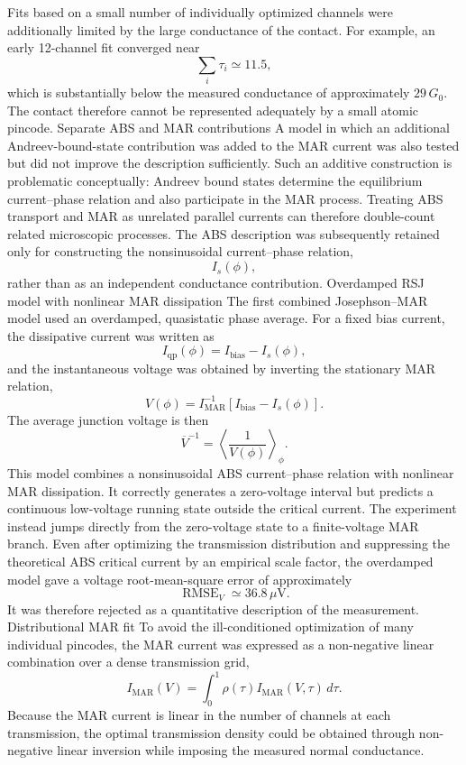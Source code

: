 Fits based on a small number of individually optimized channels were additionally limited by the large conductance of the contact. For example, an early 12-channel fit converged near
\[
\sum_i\tau_i\simeq11.5,
\]which is substantially below the measured conductance of approximately \(29\,G_0\). The contact therefore cannot be represented adequately by a small atomic pincode.
Separate ABS and MAR contributions
A model in which an additional Andreev-bound-state contribution was added to the MAR current was also tested but did not improve the description sufficiently. Such an additive construction is problematic conceptually: Andreev bound states determine the equilibrium current–phase relation and also participate in the MAR process. Treating ABS transport and MAR as unrelated parallel currents can therefore double-count related microscopic processes.
The ABS description was subsequently retained only for constructing the nonsinusoidal current–phase relation,
\[
I_s(\phi),
\]rather than as an independent conductance contribution.
Overdamped RSJ model with nonlinear MAR dissipation
The first combined Josephson–MAR model used an overdamped, quasistatic phase average. For a fixed bias current, the dissipative current was written as
\[
I_{\mathrm{qp}}(\phi)
=
I_{\mathrm{bias}}-I_s(\phi),
\]and the instantaneous voltage was obtained by inverting the stationary MAR relation,
\[
V(\phi)
=
I_{\mathrm{MAR}}^{-1}
\left[
I_{\mathrm{bias}}-I_s(\phi)
\right].
\]The average junction voltage is then
\[
\overline V^{-1}
=
\left\langle
\frac{1}{V(\phi)}
\right\rangle_\phi .
\]This model combines a nonsinusoidal ABS current–phase relation with nonlinear MAR dissipation. It correctly generates a zero-voltage interval but predicts a continuous low-voltage running state outside the critical current. The experiment instead jumps directly from the zero-voltage state to a finite-voltage MAR branch.
Even after optimizing the transmission distribution and suppressing the theoretical ABS critical current by an empirical scale factor, the overdamped model gave a voltage root-mean-square error of approximately
\[
\operatorname{RMSE}_V\simeq36.8\,\mu\mathrm V.
\]It was therefore rejected as a quantitative description of the measurement.
Distributional MAR fit
To avoid the ill-conditioned optimization of many individual pincodes, the MAR current was expressed as a non-negative linear combination over a dense transmission grid,
\[
I_{\mathrm{MAR}}(V)
=
\int_0^1 \rho(\tau)
I_{\mathrm{MAR}}(V,\tau)\,d\tau.
\]Because the MAR current is linear in the number of channels at each transmission, the optimal transmission density could be obtained through non-negative linear inversion while imposing the measured normal conductance.
